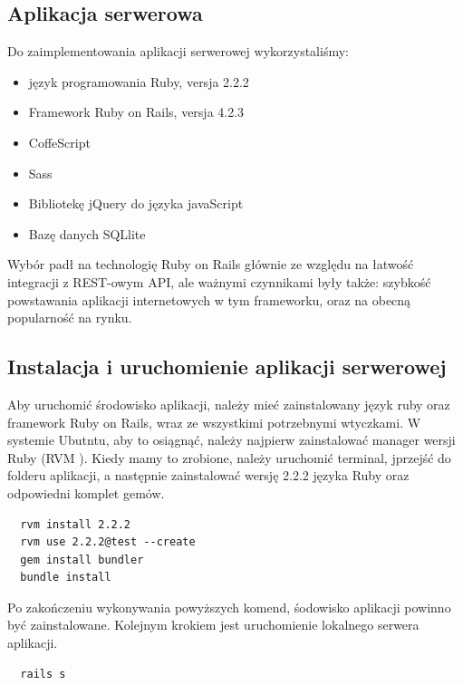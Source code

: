 \subsection{Aplikacja serwerowa}

Do zaimplementowania aplikacji serwerowej wykorzystaliśmy:

\begin{itemize}
  \item język programowania Ruby, versja 2.2.2 \cite{bib:ruby-doc}
  \item Framework Ruby on Rails, versja 4.2.3 \cite{bib:rails-doc}
  \item CoffeScript \cite{bib:coffeescript-doc}
  \item Sass \cite{bib:sass-doc}
  \item Bibliotekę jQuery do języka javaScript \cite{bib:jquery-doc}
  \item Bazę danych SQLlite
\end{itemize}

Wybór padł na technologię Ruby on Rails głównie ze względu na łatwość integracji z REST-owym API, ale ważnymi czynnikami były także: szybkość powstawania aplikacji internetowych w tym frameworku, oraz na obecną popularność na rynku.

\subsection {Instalacja i uruchomienie aplikacji serwerowej}

Aby uruchomić środowisko aplikacji, należy mieć zainstalowany język ruby oraz framework Ruby on Rails, wraz ze wszystkimi potrzebnymi wtyczkami. W systemie Ubutntu, aby to osiągnąć, należy najpierw zainstalować manager wersji Ruby (RVM \cite{bib:rvm-install}). Kiedy mamy to zrobione, należy uruchomić terminal, jprzejść do folderu aplikacji, a następnie zainstalować wersję 2.2.2 języka Ruby oraz odpowiedni komplet gemów.

\begin{lstlisting}
  rvm install 2.2.2
  rvm use 2.2.2@test --create
  gem install bundler
  bundle install
\end{lstlisting}


Po zakończeniu wykonywania powyższych komend, śodowisko aplikacji powinno być zainstalowane. Kolejnym krokiem jest uruchomienie lokalnego serwera aplikacji.

\begin{lstlisting}
  rails s
\end{lstlisting}

